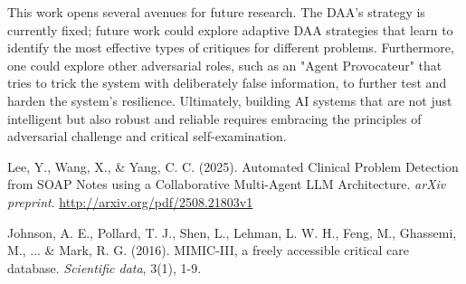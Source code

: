 \documentclass{article}
\begin{document}
This work opens several avenues for future research. The DAA's strategy is currently fixed; future work could explore adaptive DAA strategies that learn to identify the most effective types of critiques for different problems. Furthermore, one could explore other adversarial roles, such as an "Agent Provocateur" that tries to trick the system with deliberately false information, to further test and harden the system's resilience. Ultimately, building AI systems that are not just intelligent but also robust and reliable requires embracing the principles of adversarial challenge and critical self-examination.

\begin{thebibliography}{9}

Lee, Y., Wang, X., \& Yang, C. C. (2025). 
Automated Clinical Problem Detection from SOAP Notes using a Collaborative Multi-Agent LLM Architecture. 
\textit{arXiv preprint}. 
\href{http://arxiv.org/pdf/2508.21803v1}{http://arxiv.org/pdf/2508.21803v1}

Johnson, A. E., Pollard, T. J., Shen, L., Lehman, L. W. H., Feng, M., Ghassemi, M., ... \& Mark, R. G. (2016). 
MIMIC-III, a freely accessible critical care database. 
\textit{Scientific data}, 3(1), 1-9.

\end{thebibliography}
\end{document}
